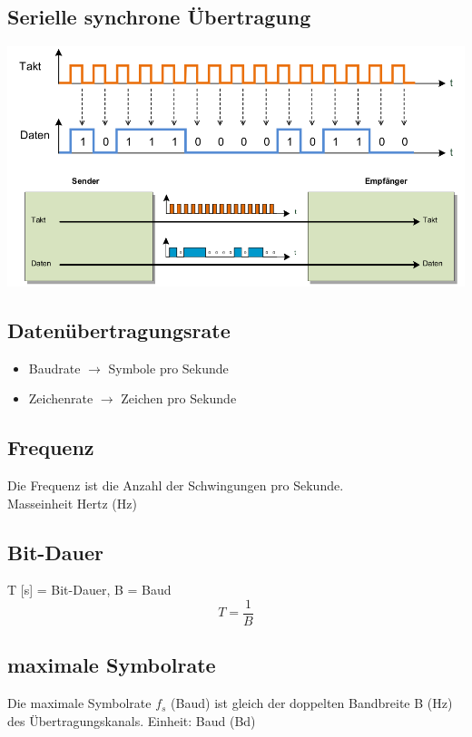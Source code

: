 \subsection{Serielle synchrone Übertragung}{
    \includegraphics[scale=.275]{img/sync.png}
}


\subsection{Datenübertragungsrate}{
    \begin{itemize}[noitemsep]
        \item Baudrate $\to$ Symbole pro Sekunde
        \item Zeichenrate $\to$ Zeichen pro Sekunde
    \end{itemize}
}

\subsection{Frequenz}{
    {Die Frequenz ist die Anzahl der Schwingungen pro Sekunde.\\
            Masseinheit Hertz (Hz)\\}
}

\subsection{Bit-Dauer }
{  T [s] = Bit-Dauer, B = Baud \\}
$$ T = \frac{1}{B}$$

\columnbreak
\subsection{maximale Symbolrate}
{    Die maximale Symbolrate $f_s$ (Baud) ist gleich der doppelten Bandbreite B (Hz) des
    Übertragungskanals.
}
{Einheit: Baud (Bd)}

